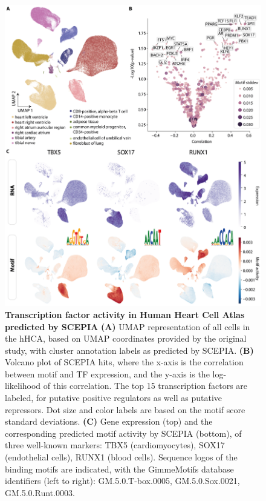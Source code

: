 \begin{figure}
    \centering
    \includegraphics[width=0.75\linewidth]{ch.scepia/imgs/SCEPIA_allCells_v10_Myriad_Figure3.png}
    \caption{\textbf{Transcription factor activity in Human Heart Cell Atlas predicted by SCEPIA} \textbf{(A)} UMAP representation of all cells in the hHCA, based on UMAP coordinates provided by the original study\cite{Kanemaru2023}, with cluster annotation labels as predicted by SCEPIA. \textbf{(B)} Volcano plot of SCEPIA hits, where the x-axis is the correlation between motif and TF expression, and the y-axis is the log-likelihood of this correlation. The top 15 transcription factors are labeled, for putative positive regulators as well as putative repressors. Dot size and color labels are based on the motif score standard deviations. \textbf{(C)} Gene expression (top) and the corresponding predicted motif activity by SCEPIA (bottom), of three well-known markers: TBX5 (cardiomyocytes), SOX17 (endothelial cells), RUNX1 (blood cells). Sequence logos of the binding motifs are indicated, with the GimmeMotifs database identifiers (left to right): GM.5.0.T-box.0005, GM.5.0.Sox.0021, GM.5.0.Runt.0003. }
    \label{fig:scepia_hhca1}
\end{figure}

